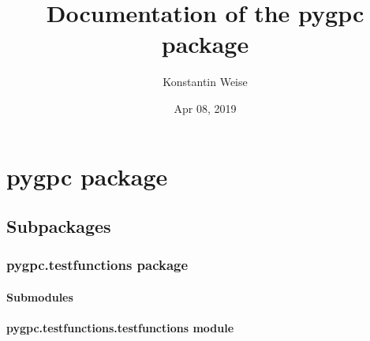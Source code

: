\documentclass[letterpaper,10pt,english,openany,oneside]{sphinxmanual}
\title{Documentation of the pygpc package}
\date{Apr 08, 2019}
\author{Konstantin Weise}
\begin{document}
\pagestyle{empty}
\maketitle
\pagestyle{plain}
\sphinxtableofcontents
\pagestyle{normal}
\label{\detokenize{index::doc}}



\chapter{pygpc package}
\label{\detokenize{pygpc:pygpc-package}}\label{\detokenize{pygpc::doc}}

\section{Subpackages}
\label{\detokenize{pygpc:subpackages}}

\subsection{pygpc.testfunctions package}
\label{\detokenize{pygpc.testfunctions:pygpc-testfunctions-package}}\label{\detokenize{pygpc.testfunctions::doc}}

\subsubsection{Submodules}
\label{\detokenize{pygpc.testfunctions:submodules}}

\subsubsection{pygpc.testfunctions.testfunctions module}
\label{\detokenize{pygpc.testfunctions:module-pygpc.testfunctions.testfunctions}}\label{\detokenize{pygpc.testfunctions:pygpc-testfunctions-testfunctions-module}}
\end{document}
